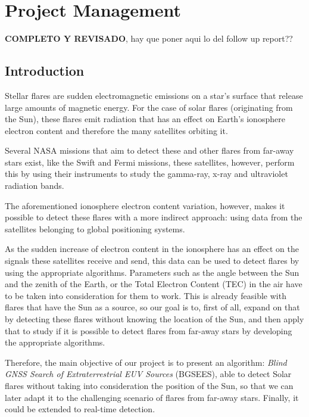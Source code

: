 \chapter{Project Management}

\textbf{COMPLETO Y REVISADO}, hay que poner aqui lo del follow up report??


\section{Introduction}

Stellar flares are sudden electromagnetic emissions on a star's surface that release large amounts of magnetic energy. For the case of solar flares (originating from the Sun), these flares emit radiation that has an effect on Earth’s ionosphere electron content and therefore the many satellites orbiting it. \cite{hernandez2012gnss}

Several NASA missions that aim to detect these and other flares from far-away stars exist, like the Swift and Fermi missions, these satellites, however, perform this by using their instruments to study the gamma-ray, x-ray and ultraviolet radiation bands. \cite{gehrels2013gamma}

The aforementioned ionosphere electron content variation, however, makes it possible to detect these flares with a more indirect approach: using data from the satellites belonging to global positioning systems.

As the sudden increase of electron content in the ionosphere has an effect on the signals these satellites receive and send, this data can be used to detect flares by using the appropriate algorithms. Parameters such as the angle between the Sun and the zenith of the Earth, or the Total Electron Content (TEC) in the air have to be taken into consideration for them to work. 
This is already feasible with flares that have the Sun as a source, so our goal is to, first of all, expand on that by detecting these flares without knowing the location of the Sun, and then apply that to study if it is possible to detect flares from far-away stars by developing the appropriate algorithms.

Therefore, the main objective of our project is to present an algorithm: \textit{Blind GNSS Search of Extraterrestrial EUV Sources} (BGSEES), able to detect Solar flares without taking into consideration the position of the Sun, so that we can later adapt it to the challenging scenario of flares from far-away stars. Finally, it could be extended to real-time detection.

